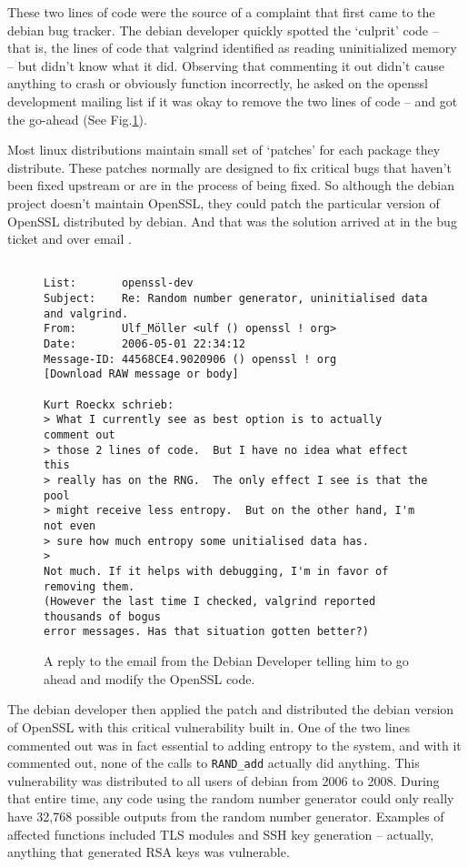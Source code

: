 \documentclass[conference]{IEEEtran}
\begin{document}
These two lines of code were the source of a complaint that first came
to the debian bug tracker\cite{2}. The debian developer quickly
spotted the `culprit' code -- that is, the lines of code that valgrind
identified as reading uninitialized memory -- but didn't know what it
did. Observing that commenting it out didn't cause anything to crash
or obviously function incorrectly, he asked on the openssl development
mailing list if it was okay to remove the two lines of code -- and got
the go-ahead (See Fig.\ref{email}).

Most linux distributions maintain small set of `patches' for each
package they distribute. These patches normally are designed to fix
critical bugs that haven't been fixed upstream or are in the process
of being fixed. So although the debian project doesn't maintain
OpenSSL, they could patch the particular version of OpenSSL
distributed by debian. And that was the solution arrived at in the bug
ticket and over email \cite{2}\cite{4}.

\begin{figure*}[!t]

\centering
\begin{displayquote}
\begin{verbatim}

List:       openssl-dev
Subject:    Re: Random number generator, uninitialised data and valgrind.
From:       Ulf_Möller <ulf () openssl ! org>
Date:       2006-05-01 22:34:12
Message-ID: 44568CE4.9020906 () openssl ! org
[Download RAW message or body]

Kurt Roeckx schrieb:
> What I currently see as best option is to actually comment out
> those 2 lines of code.  But I have no idea what effect this
> really has on the RNG.  The only effect I see is that the pool
> might receive less entropy.  But on the other hand, I'm not even
> sure how much entropy some unitialised data has.
>   
Not much. If it helps with debugging, I'm in favor of removing them. 
(However the last time I checked, valgrind reported thousands of bogus 
error messages. Has that situation gotten better?)
\end{verbatim}
\end{displayquote}

\caption{A reply to the email from the Debian Developer telling him to go ahead and modify the OpenSSL code.\cite{4}}
\label{email}
\end{figure*}


The debian developer then applied the patch and distributed the debian
version of OpenSSL with this critical vulnerability built in. One of
the two lines commented out was in fact essential to adding entropy to
the system, and with it commented out, none of the calls to
\verb|RAND_add| actually did anything. This vulnerability was
distributed to all users of debian from 2006 to 2008\cite{1}. During
that entire time, any code using the random number generator could
only really have 32,768 possible outputs from the random number
generator. Examples of affected functions included TLS modules and SSH
key generation -- actually, anything that generated RSA keys was
vulnerable.
\end{document}
